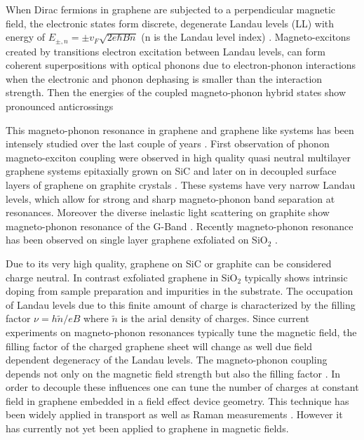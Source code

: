 \documentclass[prl,aps,superscriptaddress,showpacs,reprint]{revtex4-1}
\begin{document}
\label{Intro}  
When Dirac fermions in graphene are subjected to a perpendicular magnetic field, the electronic states form discrete, degenerate Landau levels (LL) with energy of $E_{\pm, n}=\pm v_F\sqrt{2e\hbar Bn}$ (n is the Landau level index) \cite{neto2009electronic,goerbig2011electronic}. Magneto-excitons created by transitions electron excitation between Landau levels, can form coherent superpositions with optical phonons due to electron-phonon interactions when the electronic and phonon dephasing is smaller than the interaction strength. Then the energies of the coupled magneto-phonon hybrid states show pronounced anticrossings \cite{ando2007magnetic,goerbig2007filling,goerbig2011electronic}

This magneto-phonon resonance in graphene and graphene like systems has been intensely studied over the last couple of years \cite{goler2012raman}. First observation of phonon magneto-exciton coupling were observed in high quality quasi neutral multilayer graphene systems epitaxially grown on SiC \cite{faugeras2009tuning} and later on in decoupled surface layers of graphene on graphite crystals \cite{kuhne2012polarization,faugeras2011magneto,yan2010observation}. These systems have very narrow Landau levels, which allow for strong and sharp magneto-phonon band separation at resonances. Moreover the diverse inelastic light scattering on graphite show magneto-phonon resonance of the G-Band \cite{PhysRevLett.110.227402,kossacki2011electronic,PhysRevB.80.241404,yan2010observation}. Recently magneto-phonon resonance has been observed on single layer graphene exfoliated on SiO$_2$ \cite{PhysRevLett.110.227402,kossacki2012circular}.

Due to its very high quality, graphene on SiC or graphite can be considered charge neutral. In contrast exfoliated graphene in SiO$_2$ typically shows intrinsic doping from sample preparation  and impurities in the substrate. The occupation of Landau levels due to this finite amount of charge is characterized by the filling factor $\nu = h\widetilde{n}/eB$ where $\widetilde{n}$ is the  arial density of charges. Since current experiments on magneto-phonon resonances typically tune the magnetic field, the filling factor of the charged graphene sheet will change as well due field dependent degeneracy of the Landau levels. The magneto-phonon coupling depends not only on the magnetic field strength but also the filling factor \cite{goerbig2007filling}. In order to decouple these influences one can tune the number of charges at constant field in graphene embedded in a field effect device geometry. This technique has been widely applied in transport \cite{novoselov2004electric,novoselov2005two,zhang2005experimental} as well as Raman measurements \cite{pisana2007breakdown,yan2007electric,stampfer2007raman}. However it has currently not yet been applied to graphene in magnetic fields.
\end{document}
